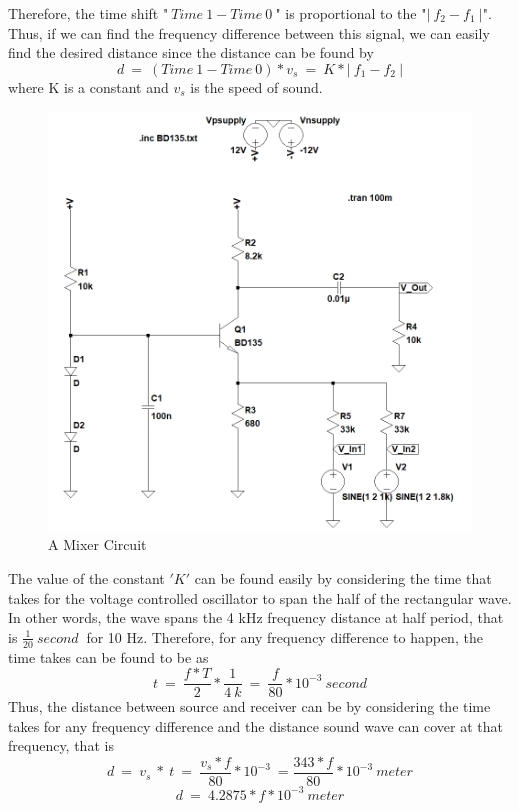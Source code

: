 \documentclass[paper]{IEEEtran}
\begin{document}
	Therefore, the time shift "$~Time~1-Time~0~$" is proportional to the "$|~f_2-f_1~|$". Thus, if we can find the frequency difference between this signal, we can easily find the desired distance since the distance can be found by
	$$ d~=~(Time~1-Time~0)*v_s~=~K*|~f_1-f_2~|$$ 
	where K is a constant and $v_s$ is the speed of sound.
	
	
\begin{figure}[h!]
\setlength{\unitlength}{\textwidth}
\center 
\includegraphics[width=0.45\unitlength]{mixer_v2_2.png}
\caption{\label{fig:mixer}A Mixer Circuit }
\end{figure}	


	The value of the constant $'K'$ can be found easily by considering the time that takes for the voltage controlled oscillator to span the half of the rectangular wave. In other words, the wave spans the 4 kHz frequency distance at half period, that is $\frac{1}{20}~second~$ for 10 Hz. Therefore, for any frequency difference to happen, the time takes can be found to be as
	$$	t~=~\frac{f*T}{2}*\frac{1}{4~k}~=~\frac{f}{80}*10^{-3}~second	$$
	Thus, the distance between source and receiver can be by considering the time takes for any frequency difference and the distance sound wave can cover at that frequency, that is 
	$$	d~=~v_s~*~t~=~\frac{v_s*f}{80}*10^{-3}~=\frac{343*f}{80}*10^{-3}~meter	$$    	
	$$	d~=~4.2875*f*10^{-3}~meter	$$	
	
\end{document}
